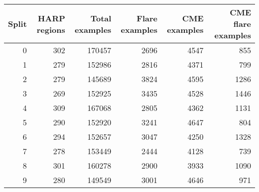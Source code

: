 \begin{tabular}{rrrrrr}
\toprule
Split & HARP regions & Total examples & Flare examples & CME examples & CME flare examples \\
\midrule
0 & 302 & 170457 & 2696 & 4547 & 855 \\
1 & 279 & 152986 & 2816 & 4371 & 799 \\
2 & 279 & 145689 & 3824 & 4595 & 1286 \\
3 & 269 & 152925 & 3435 & 4528 & 1446 \\
4 & 309 & 167068 & 2805 & 4362 & 1131 \\
5 & 290 & 152920 & 3241 & 4647 & 804 \\
6 & 294 & 152657 & 3047 & 4250 & 1328 \\
7 & 278 & 153449 & 2444 & 4128 & 739 \\
8 & 301 & 160278 & 2900 & 3933 & 1090 \\
9 & 280 & 149549 & 3001 & 4646 & 971 \\
\bottomrule
\end{tabular}
